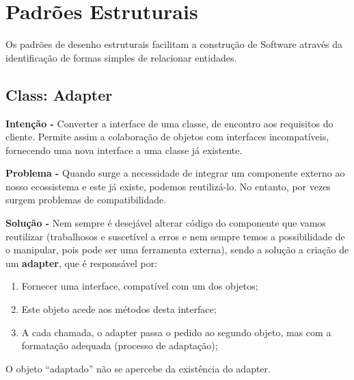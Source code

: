 \documentclass{article}
\begin{document}
\vspace{4mm}
\section{Padrões Estruturais}

Os padrões de desenho estruturais facilitam a construção de Software através da
identificação de formas simples de relacionar entidades.

\subsection{Class: Adapter}

\begin{flushleft}
    \textbf{Intenção -} Converter a interface de uma classe, de encontro aos requisitos do cliente. Permite
    assim a colaboração de objetos com interfaces incompatíveis, fornecendo uma nova
    interface a uma classe já existente.
\end{flushleft}

\begin{flushleft}
    \textbf{Problema -} Quando surge a necessidade de integrar um componente externo ao nosso
    ecossistema e este já existe, podemos reutilizá-lo. No entanto, por vezes surgem
    problemas de compatibilidade.

\end{flushleft}

\begin{flushleft}
    \textbf{Solução -} Nem sempre é desejável alterar código do componente que vamos reutilizar
    (trabalhosos e suscetível a erros e nem sempre temos a possibilidade de o
    manipular, pois pode ser uma ferramenta externa), sendo a solução a criação de um
    \textbf{adapter}, que é responsável por:

    \begin{enumerate}
        \item Fornecer uma interface, compatível com um dos objetos;
        \item Este objeto acede aos métodos desta interface;
        \item A cada chamada, o adapter passa o pedido ao segundo objeto, mas com a
        formatação adequada (processo de adaptação);
    \end{enumerate}

    O objeto “adaptado” não se apercebe da existência do adapter.
\end{flushleft}
\end{document}
